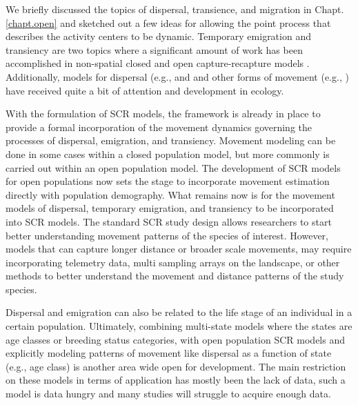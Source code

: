 
We briefly discussed the topics of dispersal,
transience, and migration in Chapt. \ref{chapt.open} and sketched out
a few ideas for allowing the point process that describes the activity centers
to be dynamic. %
Temporary emigration and transiency are two topics where
a significant amount of work has been accomplished in non-spatial closed and open capture-recapture
models \citep{kendall_etal:1997, pradel_hines:1997, hines_etal:2003,
clavel_etal:2008, gilroy_etal:2012,chandler_etal:2011}.
Additionally, models for dispersal (e.g., \citet{clobert_etal:2001,
ovaskainen:2004, ovaskainen_etal:2008} and
and other forms of movement (e.g., \cite{jonsen_etal:2005, johnson_etal:2008b,
mcclintock_etal:2012}) have received quite a bit of attention and development in
ecology.

With the formulation of SCR models, the framework is already in place to provide
a formal incorporation of the movement dynamics governing the processes
of dispersal, emigration, and transiency. Movement modeling can be done
in some cases within a closed
population model, but more commonly is carried out within an open population model.
The development of SCR models for open populations \citep{gardner_etal:2012} now sets
the stage to incorporate
movement estimation directly with population demography. What remains now is for the
movement models
of dispersal, temporary emigration, and transiency to be incorporated into SCR models.
The standard SCR study design allows researchers to start better understanding movement patterns of
the species of interest.  However, models that can capture longer distance or broader scale movements,
may require incorporating telemetry data, multi sampling arrays on the landscape, or other
methods to better understand the movement and distance patterns of the study species.

Dispersal and emigration can also be related to the life stage of an individual in
a certain population.  Ultimately, combining multi-state models where the states are
age classes or breeding status categories, with open population SCR models and explicitly
modeling patterns of movement like dispersal as a function of state (e.g., age class) is
another area wide open for development.  The main restriction on these models in terms
of application has mostly been the lack of data, such a model is data hungry and many studies
will struggle to acquire enough data.


